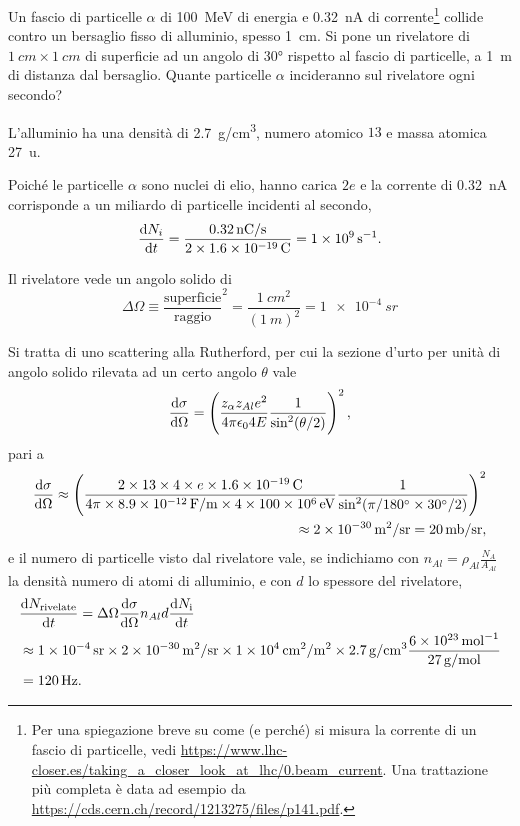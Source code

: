 \begin{Exercise}[title={Scattering Rutherford}]
Un fascio di particelle $\alpha$ di \SI{100}{MeV} di energia e
\SI{0.32}{nA} di corrente\footnote{Per una spiegazione breve su come
  (e perché) si misura la corrente di un fascio di particelle, vedi
  \url{https://www.lhc-closer.es/taking_a_closer_look_at_lhc/0.beam_current}. Una
  trattazione più completa è data ad esempio da
  \url{https://cds.cern.ch/record/1213275/files/p141.pdf}.} collide
contro un bersaglio fisso di alluminio, spesso \SI{1}{cm}. Si pone un
rivelatore di $\SI{1}{cm}\times\SI{1}{cm}$ di superficie ad un angolo
di \ang{30} rispetto al fascio di particelle, a \SI{1}{m} di distanza
dal bersaglio. Quante particelle $\alpha$ incideranno sul rivelatore
ogni secondo?
\end{Exercise}
\begin{Answer}
L'alluminio ha una densità di \SI{2.7}{g/cm^3}, numero atomico $13$ e massa atomica \SI{27}{u}.

Poiché le particelle $\alpha$ sono nuclei di elio, hanno carica $2e$ e la corrente di \SI{0.32}{nA} corrisponde a un miliardo di particelle incidenti al secondo,
\[
\dv{N_i}{t}=\frac{\SI{0.32}{nC/s}}{2\times\SI{1.6e-19}{C}} = \SI{1e9}{s^{-1}}.
\]

Il rivelatore vede un angolo solido di
\[
\Delta\Omega\equiv \frac{\text{superficie}}{\text{raggio}}^2 = \frac{\SI{1}{cm^2}}{(\SI{1}{m})^2} = \SI{1e-4}{sr}
\]

Si tratta di uno scattering alla Rutherford, per cui la sezione d'urto per unità di angolo solido rilevata ad un certo angolo $\theta$ vale
\[
\dv{\sigma}{\Omega} = \left(\frac{z_{\alpha}z_{Al}e^2}{4\pi\epsilon_04E}\frac{1}{\sin^2(\theta/2)}\right)^2,
\]
pari a
\begin{equation}\begin{split}
\dv{\sigma}{\Omega} \approx \left(\frac{2\times13\times4\times e\times\SI{1.6e-19}{C}}{4\pi\times\SI{8.9e-12}{F/m}\times4\times\SI{100e6}{eV}}\frac{1}{\sin^2(\pi/\ang{180}\times\ang{30}/2)}\right)^2\\
\approx \SI{2e-30}{m^2/sr}=\SI{20}{mb/sr},
\end{split}\end{equation}
e il numero di particelle visto dal rivelatore vale, se indichiamo con $n_{Al}=\rho_{Al}\frac{N_A}{A_{Al}}$ la densità numero di atomi di alluminio, e con $d$ lo spessore del rivelatore,
\begin{equation*}
\begin{split}
&\dv{N_\text{rivelate}}{t}=\Delta\Omega\dv{\sigma}{\Omega}n_{Al}d \dv{N_\text{i}}{t}\\ 
&\approx\SI{1e-4}{sr}\times \SI{2e-30}{m^2/sr} \times \SI{1e4}{cm^2/m^2}  \times \SI{2.7}{g/cm^3} \frac{\SI{6e23}{mol^{-1}}}{\SI{27}{g/mol}}\\&= \SI{120}{Hz}.
\end{split}
\end{equation*}
\end{Answer}

